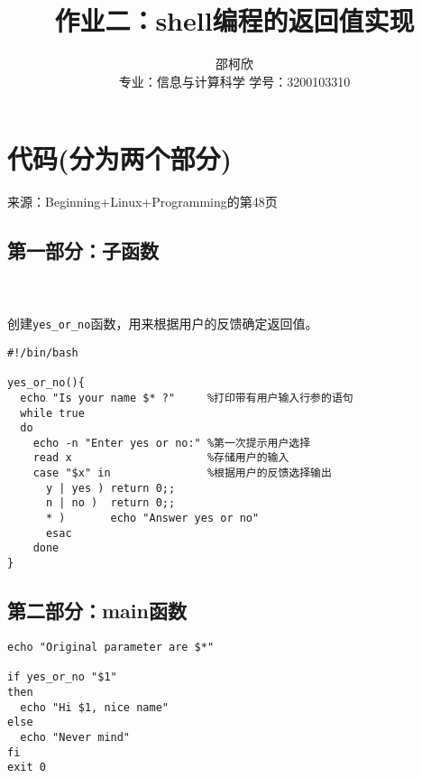 \documentclass{ctexart}
\title{作业二：shell编程的返回值实现}
\author{邵柯欣\\专业：信息与计算科学 学号：3200103310}
\begin{document}
\maketitle
\pagestyle{empty}

\section{代码(分为两个部分)}
来源：Beginning+Linux+Programming的第48页
\subsection{第一部分：子函数}
~\\
\\创建\verb|yes_or_no|函数，用来根据用户的反馈确定返回值。
\begin{verbatim}
#!/bin/bash

yes_or_no(){
  echo "Is your name $* ?"     %打印带有用户输入行参的语句
  while true
  do
    echo -n "Enter yes or no:" %第一次提示用户选择
    read x                     %存储用户的输入
    case "$x" in               %根据用户的反馈选择输出
      y | yes ) return 0;;
      n | no )  return 0;;
      * )       echo "Answer yes or no"
      esac
    done
}
\end{verbatim}

\subsection{第二部分：main函数}
\begin{verbatim}
echo "Original parameter are $*"

if yes_or_no "$1"
then
  echo "Hi $1, nice name"
else
  echo "Never mind"
fi
exit 0
\end{verbatim}
~\\
~\\
\end{document}
